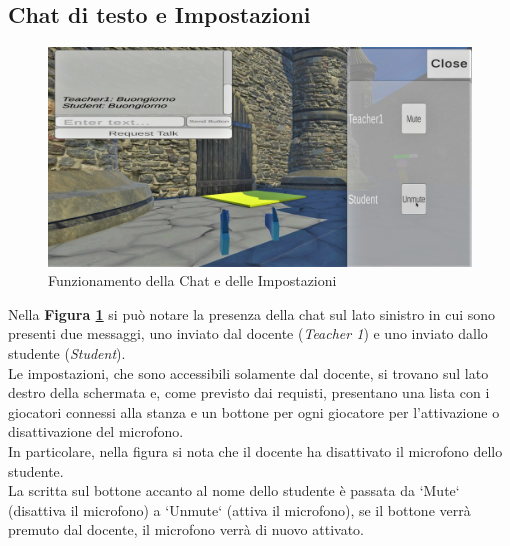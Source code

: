 \subsection{Chat di testo e Impostazioni}
\begin{figure}[H]
\centering
\includegraphics[scale = 0.25]{Immagini/Dimostrazioni d'uso/impostazioni.jpg}
\caption{Funzionamento della Chat e delle Impostazioni}
\label{fig:5.6}
\end{figure}
Nella \textbf{Figura \ref{fig:5.6}} si può notare la presenza della chat sul lato sinistro in cui sono presenti due messaggi, uno inviato dal docente (\textit{Teacher 1}) e uno inviato dallo studente (\textit{Student}).
\\Le impostazioni, che sono accessibili solamente dal docente, si trovano sul lato destro della schermata e, come previsto dai requisti, presentano una lista con i giocatori connessi alla stanza e un bottone per ogni giocatore per l'attivazione o disattivazione del microfono.
\\In particolare, nella figura si nota che il docente ha disattivato il microfono dello studente.
\\La scritta sul bottone accanto al nome dello studente è passata da `Mute` (disattiva il microfono) a `Unmute` (attiva il microfono), se il bottone verrà premuto dal docente, il microfono verrà di nuovo attivato.
